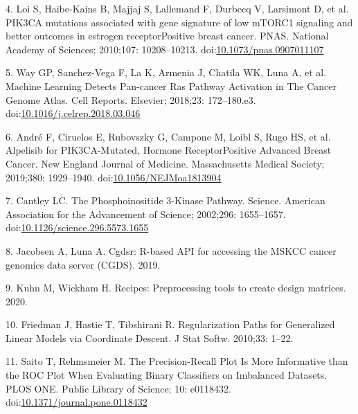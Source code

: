 \documentclass[10pt,letterpaper]{article}
\begin{document}
\leavevmode\hypertarget{ref-loiPIK3CAMutationsAssociated2010}{}%
4. Loi S, Haibe-Kains B, Majjaj S, Lallemand F, Durbecq V, Larsimont D,
et al. PIK3CA mutations associated with gene signature of low mTORC1
signaling and better outcomes in estrogen receptorPositive breast
cancer. PNAS. National Academy of Sciences; 2010;107: 10208--10213.
doi:\href{https://doi.org/10.1073/pnas.0907011107}{10.1073/pnas.0907011107}

\leavevmode\hypertarget{ref-way_2018_machine_cellreports}{}%
5. Way GP, Sanchez-Vega F, La K, Armenia J, Chatila WK, Luna A, et al.
Machine Learning Detects Pan-cancer Ras Pathway Activation in The Cancer
Genome Atlas. Cell Reports. Elsevier; 2018;23: 172--180.e3.
doi:\href{https://doi.org/10.1016/j.celrep.2018.03.046}{10.1016/j.celrep.2018.03.046}

\leavevmode\hypertarget{ref-andre_2019_alpelisib_nengljmeda}{}%
6. André F, Ciruelos E, Rubovszky G, Campone M, Loibl S, Rugo HS, et al.
Alpelisib for PIK3CA-Mutated, Hormone ReceptorPositive Advanced Breast
Cancer. New England Journal of Medicine. Massachusetts Medical Society;
2019;380: 1929--1940.
doi:\href{https://doi.org/10.1056/NEJMoa1813904}{10.1056/NEJMoa1813904}

\leavevmode\hypertarget{ref-cantleyPhosphoinositide3KinasePathway2002}{}%
7. Cantley LC. The Phosphoinositide 3-Kinase Pathway. Science. American
Association for the Advancement of Science; 2002;296: 1655--1657.
doi:\href{https://doi.org/10.1126/science.296.5573.1655}{10.1126/science.296.5573.1655}

\leavevmode\hypertarget{ref-jacobsenCgdsrRbasedAPI2019}{}%
8. Jacobsen A, Luna A. Cgdsr: R-based API for accessing the MSKCC cancer
genomics data server (CGDS). 2019.

\leavevmode\hypertarget{ref-kuhnRecipesPreprocessingTools2020}{}%
9. Kuhn M, Wickham H. Recipes: Preprocessing tools to create design
matrices. 2020.

\leavevmode\hypertarget{ref-friedmanRegularizationPathsGeneralized2010}{}%
10. Friedman J, Hastie T, Tibshirani R. Regularization Paths for
Generalized Linear Models via Coordinate Descent. J Stat Softw. 2010;33:
1--22.

\leavevmode\hypertarget{ref-saitoPrecisionRecallPlotMore2015}{}%
11. Saito T, Rehmsmeier M. The Precision-Recall Plot Is More Informative
than the ROC Plot When Evaluating Binary Classifiers on Imbalanced
Datasets. PLOS ONE. Public Library of Science; 10: e0118432.
doi:\href{https://doi.org/10.1371/journal.pone.0118432}{10.1371/journal.pone.0118432}
\end{document}
